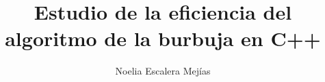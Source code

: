 \documentclass[a4paper,11pt]{article}
\begin{document}
\title{Estudio de la eficiencia del algoritmo de la burbuja en C++}
\author{Noelia Escalera Mejías}
\date{}
\maketitle
\end{document}
